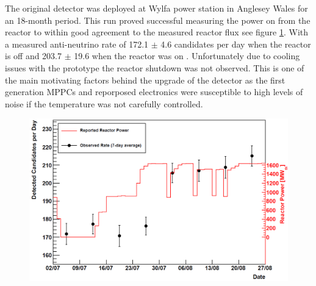 The original detector was deployed at Wylfa power station in Anglesey Wales for an 18-month period. This run proved successful measuring the power on from the reactor to within good agreement to the measured reactor flux see figure \ref{fig:prototypeMeasumentFlux}. With a measured anti-neutrino rate of 172.1 $\pm$ 4.6 candidates per day when the reactor is off and 203.7 $\pm$ 19.6 when the reactor was on \cite{Carroll_2018}. Unfortunately due to cooling issues with the prototype the reactor shutdown was not observed. This is one of the main motivating factors behind the upgrade of the detector as the first generation MPPCs and reporposed electronics were susceptible to high levels of noise if the temperature was not carefully controlled. 
\begin{figure}[htbp]
 \centering
 \includegraphics[width=0.90\linewidth]{Chapter2/Figs/Raster/prototypeMeasureOnFig.png} 
 \label{fig:prototypeMeasumentFlux}
\end{figure}


